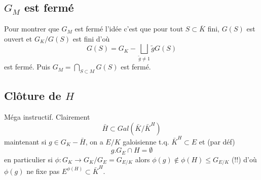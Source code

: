 \documentclass[a4paper,12pt]{article}
\theoremstyle{plain}
\theoremstyle{definition}
\theoremstyle{remark}
\begin{document}
\subsection{$G_M$ est fermé}
Pour montrer que $G_M$ est
fermé l'idée c'est que pour tout $S\subset \overline K$
fini, $G(S)$ est ouvert et $G_K/G(S)$ est fini d'où 
\[G(S)=G_K-\bigsqcup_{\tilde g\ne 1}\tilde gG(S)\]
est fermé. Puis $G_M=\bigcap_{S\subset M}G(S)$ est fermé.
\subsection{Clôture de $H$}
Méga instructif. Clairement 
\[\bar H\subset Gal(\bar K/\bar K^H)\]
maintenant si $g\in G_K-\bar H$, on a $E/K$ galoisienne
t.q. $\bar K^H\subset E$ et (par déf)
\[g.G_E\cap H=\emptyset\]
en particulier si $\phi\colon G_K\to G_K/G_E=G_{E/K}$
alors $\phi(g)\notin \phi(H)\leq G_{E/K}$ (!!) d'où
$\phi(g)$ ne fixe pas $E^{\phi(H)}\subset \bar K^H$.


\printbibliography
\end{document}
